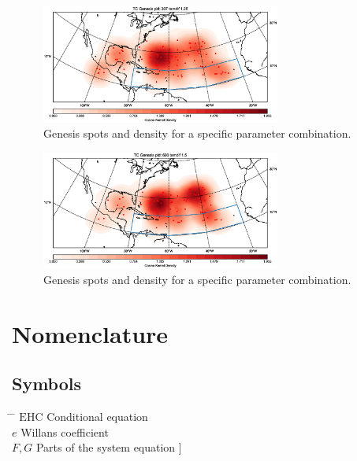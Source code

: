 \begin{figure}[ht]
	\centering
	\includegraphics[width=0.7\textwidth]{img/genesis_plot_temdif125.eps}
	\caption{Genesis spots and density for a specific parameter combination.}
\end{figure}
\begin{figure}[ht]
	\centering
	\includegraphics[width=0.7\textwidth]{img/genesis_plot_temdif15.eps}
	\caption{Genesis spots and density for a specific parameter combination.}
\end{figure}
 \cleardoublepage
 

\chapter*{Nomenclature}\label{chap:symbole}
 
 \section*{Symbols}
\begin{tabbing}
 \hspace*{1.6cm} \= \hspace*{8cm} \= \kill
 $\mathrm{EHC}$ \> Conditional equation \> [$-$] \\[0.5ex]
 $e$ \> Willans coefficient \> [$-$] \\[0.5ex]
 $F,G$ \> Parts of the system equation \> [\unitfrac[]{K}{s}]
\end{tabbing}

